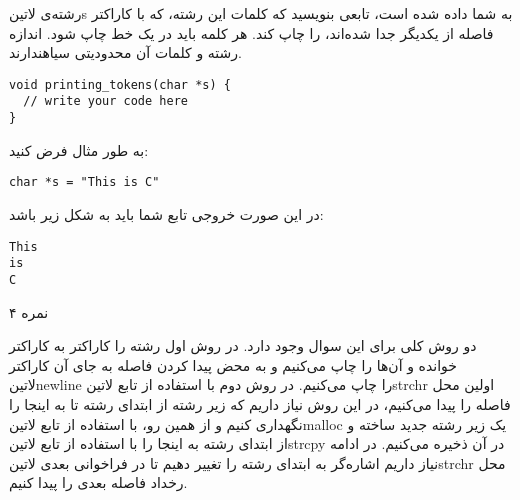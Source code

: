
رشته‌ی ‌لاتین{s} به شما داده شده است، تابعی بنویسید که کلمات این رشته، که با کاراکتر فاصله از یکدیگر جدا شده‌اند، را چاپ کند.
هر کلمه باید در یک خط چاپ شود.
اندازه رشته و کلمات آن محدودیتی ‌سیاه{ندارند}.

\begin{latin}
\begin{verbatim}
void printing_tokens(char *s) {
  // write your code here
}
\end{verbatim}
\end{latin}

به طور مثال فرض کنید:

\begin{latin}
\begin{verbatim}
char *s = "This is C"
\end{verbatim}
\end{latin}

در این صورت خروجی تابع شما باید به شکل زیر باشد:

\begin{latin}
\begin{verbatim}
This
is
C
\end{verbatim}
\end{latin}


۴ نمره


دو روش کلی برای این سوال وجود دارد. در روش اول رشته را کاراکتر به کاراکتر خوانده و آن‌ها را چاپ می‌کنیم و به محض پیدا کردن فاصله به جای آن کاراکتر ‌لاتین{newline} را چاپ می‌کنیم.
در روش دوم با استفاده از تابع ‌لاتین{strchr} اولین محل فاصله را پیدا می‌کنیم، در این روش نیاز داریم که زیر رشته از ابتدای رشته تا به اینجا را نگهداری کنیم و از همین رو، با استفاده از تابع ‌لاتین{malloc}
یک زیر رشته جدید ساخته و از ابتدای رشته به اینجا را با استفاده از تابع ‌لاتین{strcpy} در آن ذخیره می‌کنیم. در ادامه نیاز داریم اشاره‌گر به ابتدای رشته را تغییر دهیم تا در فراخوانی بعدی ‌لاتین{strchr}
محل رخداد فاصله بعدی را پیدا کنیم.

\begin{latin}
  \inputminted{c}{./printing-tokens/main.c}
\end{latin}


